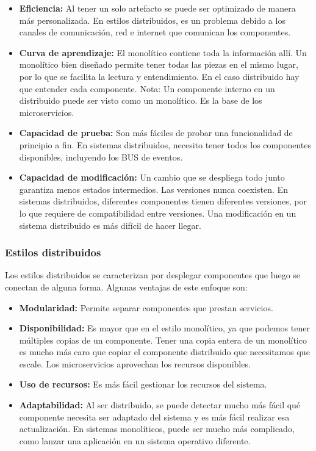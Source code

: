 \documentclass[executivepaper]{article}
\begin{document}
\begin{itemize}
\item \textbf{Eficiencia:} Al tener un solo artefacto se puede ser optimizado de manera más personalizada. En estilos distribuidos, es un problema debido a los canales de comunicación, red e internet que comunican los componentes.
\item \textbf{Curva de aprendizaje:} El monolítico contiene toda la información allí. Un monolítico bien diseñado permite tener todas las piezas en el mismo lugar, por lo que se facilita la lectura y entendimiento. En el caso distribuido hay que entender cada componente. Nota: Un componente interno en un distribuido puede ser visto como un monolítico. Es la base de los microservicios.
\item \textbf{Capacidad de prueba:} Son más fáciles de probar una funcionalidad de principio a fin. En sistemas distribuidos, necesito tener todos los componentes disponibles, incluyendo los BUS de eventos.
\item \textbf{Capacidad de modificación:} Un cambio que se despliega todo junto garantiza menos estados intermedios. Las versiones nunca coexisten. En sistemas distribuidos, diferentes componentes tienen diferentes versiones, por lo que requiere de compatibilidad entre versiones. Una modificación en un sistema distribuido es más difícil de hacer llegar.
\end{itemize}

\subsubsection*{Estilos distribuidos}

Los estilos distribuidos se caracterizan por desplegar componentes que luego se conectan de alguna forma. Algunas ventajas de este enfoque son:

\begin{itemize}
\item \textbf{Modularidad:} Permite separar componentes que prestan servicios.
\item \textbf{Disponibilidad:} Es mayor que en el estilo monolítico, ya que podemos tener múltiples copias de un componente. Tener una copia entera de un monolítico es mucho más caro que copiar el componente distribuido que necesitamos que escale. Los microservicios aprovechan los recursos disponibles.
\item \textbf{Uso de recursos:} Es más fácil gestionar los recursos del sistema.
\item \textbf{Adaptabilidad:} Al ser distribuido, se puede detectar mucho más fácil qué componente necesita ser adaptado del sistema y es más fácil realizar esa actualización. En sistemas monolíticos, puede ser mucho más complicado, como lanzar una aplicación en un sistema operativo diferente.
\end{itemize}
\end{document}
